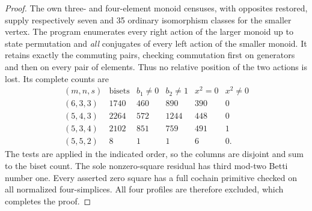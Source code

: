 \begin{proof}
The own three- and four-element monoid censuses, with opposites
restored, supply respectively seven and 35 ordinary isomorphism
classes for the smaller vertex. The program
 enumerates every right
action of the larger monoid up to state permutation and \emph{all}
conjugates of every left action of the smaller monoid. It retains
exactly the commuting pairs, checking commutation first on
generators and then on every pair of elements. Thus no relative
position of the two actions is lost. Its complete counts are
\[
\begin{array}{c|r|r|r|r|r}
(m,n,s)&\text{bisets}&b_1\ne0&b_2\ne1&x^2=0&x^2\ne0\\\hline
(6,3,3)&1740&460&890&390&0\\
(5,4,3)&2264&572&1244&448&0\\
(5,3,4)&2102&851&759&491&1\\
(5,5,2)&8&1&1&6&0.
\end{array}
\]
The tests are applied in the indicated order, so the columns are
disjoint and sum to the biset count. The sole nonzero-square
residual has third mod-two Betti number one. Every asserted zero
square has a full cochain primitive checked on all normalized
four-simplices. All four profiles are therefore excluded, which
completes the proof.
\end{proof}
